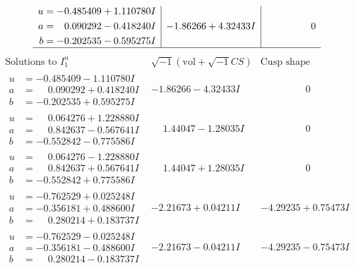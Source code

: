 \documentclass[1p]{elsarticle_modified}
\theoremstyle{definition}
\newcommand{\I}{\sqrt{-1}}
\begin{document}
$$\begin{array}{c|c|c}
\begin{aligned}
u &= -0.485409 + 1.110780 I \\
a &= \phantom{-}0.090292 - 0.418240 I \\
b &= -0.202535 - 0.595275 I\end{aligned}
 & -1.86266 + 4.32433 I & \phantom{-0.000000 } 0\\
 \hline 
 \end{array}$$\newpage$$\begin{array}{c|c|c}  
\text{Solutions to }I^u_{1}& \I (\text{vol} + \sqrt{-1}CS) & \text{Cusp shape}\\
 \hline 
\begin{aligned}
u &= -0.485409 - 1.110780 I \\
a &= \phantom{-}0.090292 + 0.418240 I \\
b &= -0.202535 + 0.595275 I\end{aligned}
 & -1.86266 - 4.32433 I & \phantom{-0.000000 } 0 \\ \hline\begin{aligned}
u &= \phantom{-}0.064276 + 1.228880 I \\
a &= \phantom{-}0.842637 - 0.567641 I \\
b &= -0.552842 - 0.775586 I\end{aligned}
 & \phantom{-}1.44047 - 1.28035 I & \phantom{-0.000000 } 0 \\ \hline\begin{aligned}
u &= \phantom{-}0.064276 - 1.228880 I \\
a &= \phantom{-}0.842637 + 0.567641 I \\
b &= -0.552842 + 0.775586 I\end{aligned}
 & \phantom{-}1.44047 + 1.28035 I & \phantom{-0.000000 } 0 \\ \hline\begin{aligned}
u &= -0.762529 + 0.025248 I \\
a &= -0.356181 + 0.488600 I \\
b &= \phantom{-}0.280214 + 0.183737 I\end{aligned}
 & -2.21673 + 0.04211 I & -4.29235 + 0.75473 I \\ \hline\begin{aligned}
u &= -0.762529 - 0.025248 I \\
a &= -0.356181 - 0.488600 I \\
b &= \phantom{-}0.280214 - 0.183737 I\end{aligned}
 & -2.21673 - 0.04211 I & -4.29235 - 0.75473 I \\ \hline\begin{aligned}

\end{aligned}
\end{array}$$
\end{document}

